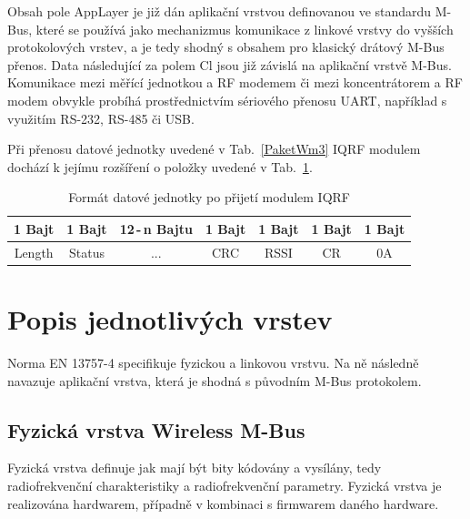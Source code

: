Obsah pole AppLayer je již dán aplikační vrstvou definovanou ve standardu M-Bus, které se používá jako mechanizmus komunikace z linkové vrstvy do vyšších protokolových vrstev, a je tedy shodný s obsahem pro klasický drátový M-Bus přenos.  Data následující za polem Cl jsou již závislá na aplikační vrstvě M-Bus. Komunikace mezi měřící jednotkou a RF modemem či mezi koncentrátorem a RF modem obvykle probíhá prostřednictvím sériového přenosu UART, například s využitím RS-232, RS-485 či USB.

Při přenosu datové jednotky uvedené v Tab.~\ref{PaketWm3} IQRF modulem dochází k jejímu rozšíření o položky uvedené v Tab.~\ref{PaketWm4}.

\begin{table}[!h]
\centering
\begin{tabular}{ccccccc}
1 Bajt & 1 Bajt & 12\,-\,n Bajtu & 1 Bajt & 1 Bajt & 1 Bajt & 1 Bajt\\ \hline
\multicolumn{1}{|c|}{Length} & \multicolumn{1}{c|}{Status} & \multicolumn{1}{c|}{...} & \multicolumn{1}{c|}{CRC} & \multicolumn{1}{c|}{RSSI} & \multicolumn{1}{c|}{CR} & \multicolumn{1}{c|}{0A}\\ \hline
\end{tabular}
\caption{Formát datové jednotky po přijetí modulem IQRF}
\label{PaketWm4}
\end{table}






\section{Popis jednotlivých vrstev}

Norma EN 13757-4 specifikuje fyzickou a linkovou vrstvu. Na ně následně navazuje aplikační vrstva, která je shodná s původním M-Bus protokolem.

\subsection{Fyzická vrstva Wireless M-Bus}
Fyzická vrstva definuje jak mají být bity kódovány a vysílány, tedy radiofrekvenční charakteristiky a radiofrekvenční parametry. Fyzická vrstva je realizována hardwarem, případně v kombinaci s firmwarem daného hardware.


